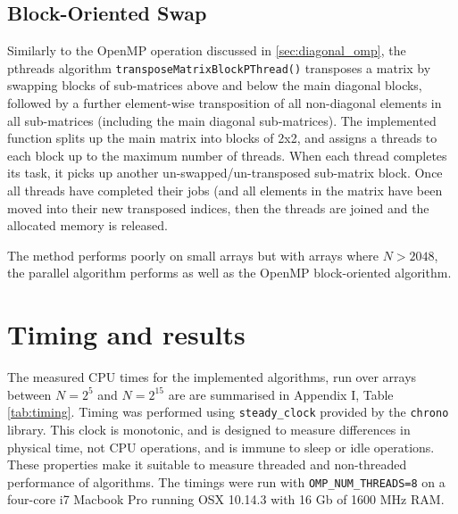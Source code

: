 \documentclass[10 pt, conference]{cssconf}
\begin{document}
\begin{multicols}{2}
\subsection{Block-Oriented Swap}
Similarly to the OpenMP operation discussed in \cref{sec:diagonal_omp}, the pthreads algorithm \verb|transposeMatrixBlockPThread()| transposes a matrix by swapping blocks of sub-matrices above and below the main diagonal blocks, followed by a further element-wise transposition of all non-diagonal elements in all sub-matrices (including the main diagonal sub-matrices). The implemented function splits up the main matrix into blocks of 2x2, and assigns a threads to each block up to the maximum number of threads. When each thread completes its task, it picks up another un-swapped/un-transposed sub-matrix block. Once all threads have completed their jobs (and all elements in the matrix have been moved into their new transposed indices, then the threads are joined and the allocated memory is released.

The method performs poorly on small arrays but with arrays where $N>2048$, the parallel algorithm performs as well as the OpenMP block-oriented algorithm.
\section{Timing and results}
The measured CPU times for the implemented algorithms, run over arrays between $N=2^5$ and $N=2^15$ are are summarised in Appendix I, Table \ref{tab:timing}. Timing was performed using \verb|steady_clock| provided by the \verb|chrono| library. This clock is monotonic, and is designed to measure differences in physical time, not CPU operations, and is immune to sleep or idle operations. These properties make it suitable to measure threaded and non-threaded performance of algorithms. The timings were run with \verb|OMP_NUM_THREADS=8| on a four-core i7 Macbook Pro running OSX 10.14.3 with 16 Gb of 1600 MHz RAM.


\end{multicols}
\end{document}
